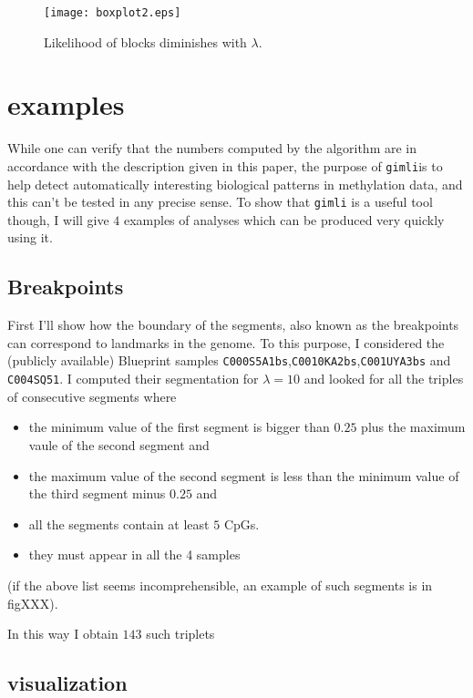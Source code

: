 \documentclass[12pt]{amsart}
\newcommand{\gimli}{\texttt{gimli}}
\begin{document}
\begin{figure}\label{boxplot2}
\texttt{[image: boxplot2.eps]}
\caption{Likelihood of blocks diminishes with $\lambda$.}
\end{figure}

\section{examples}

While one can verify that the numbers computed by the algorithm are in 
accordance with the description
given in this paper, the purpose of \gimli is to help 
detect automatically interesting
biological patterns in methylation data, and this can't be tested in any 
precise sense. To show that \gimli{} is a useful tool
though, I will give $4$ examples of analyses which can be produced very quickly
using it. 

\subsection{Breakpoints}

First I'll show how the boundary of the segments, also known as the breakpoints
can correspond to landmarks in the genome. To this purpose, I considered the (publicly available)
Blueprint samples \verb=C000S5A1bs=,\verb=C0010KA2bs=,\verb=C001UYA3bs= and \verb=C004SQ51=.
I computed their segmentation for $\lambda=10$ and looked for all the triples of consecutive segments
where 
\begin{itemize}
\item{} the minimum value of the first segment is bigger than $0.25$ plus the maximum vaule
of the second segment and
\item{} the maximum value of the second segment is less than the minimum value of the third
segment minus $0.25$ and
\item{} all the segments contain at least $5$ CpGs.
\item{} they must appear in all the 4 samples
\end{itemize}

(if the above list seems incomprehensible, an example of such segments is in figXXX).


In this way I obtain $143$ such triplets


\subsection{visualization}
\end{document}
